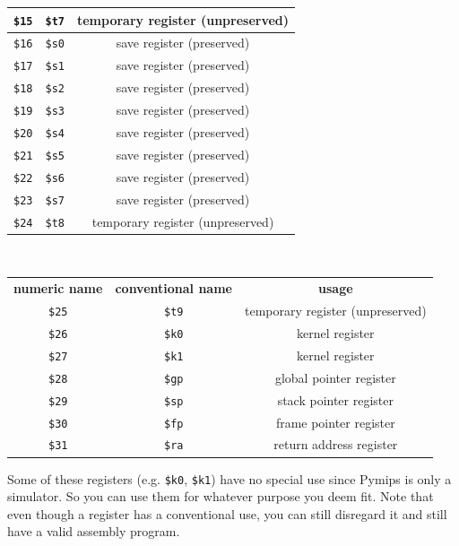 \documentclass[12pt]{article}
\begin{document}
\begin{tabular}{c | c | c}
    \texttt{\$15} & \texttt{\$t7} & temporary register (unpreserved) \\ \hline
    \texttt{\$16} & \texttt{\$s0} & save register (preserved) \\ \hline
    \texttt{\$17} & \texttt{\$s1} & save register (preserved) \\ \hline
    \texttt{\$18} & \texttt{\$s2} & save register (preserved) \\ \hline
    \texttt{\$19} & \texttt{\$s3} & save register (preserved) \\ \hline
    \texttt{\$20} & \texttt{\$s4} & save register (preserved) \\ \hline
    \texttt{\$21} & \texttt{\$s5} & save register (preserved) \\ \hline
    \texttt{\$22} & \texttt{\$s6} & save register (preserved) \\ \hline
    \texttt{\$23} & \texttt{\$s7} & save register (preserved) \\ \hline
    \texttt{\$24} & \texttt{\$t8} & temporary register (unpreserved) \\ \hline
\end{tabular}\\

\begin{tabular}{c | c | c}
\textbf{numeric name} & \textbf{conventional name} & \textbf{usage}\\
    \hhline{=|=|=}
    \texttt{\$25} & \texttt{\$t9} & temporary register (unpreserved) \\ \hline
    \texttt{\$26} & \texttt{\$k0} & kernel register \\ \hline
    \texttt{\$27} & \texttt{\$k1} & kernel register \\ \hline
    \texttt{\$28} & \texttt{\$gp} & global pointer register \\ \hline
    \texttt{\$29} & \texttt{\$sp} & stack pointer register \\ \hline
    \texttt{\$30} & \texttt{\$fp} & frame pointer register \\ \hline
    \texttt{\$31} & \texttt{\$ra} & return address register \\ \hline
\end{tabular}

\vspace{0.1in} Some of these registers (e.g. \texttt{\$k0}, \texttt{\$k1}) have
     no special use since Pymips is only a simulator. So you can use them for
     whatever purpose you deem fit. Note that even though a register has a
     conventional use, you can still disregard it and still have a valid
     assembly program.
\end{document}
